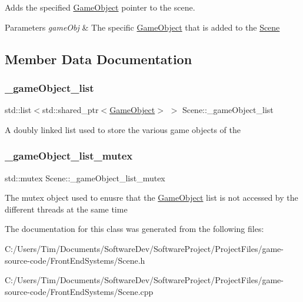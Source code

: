 Adds the specified \hyperlink{class_game_object}{Game\+Object} pointer to the scene. 


\begin{DoxyParams}{Parameters}
{\em game\+Obj} & The specific \hyperlink{class_game_object}{Game\+Object} that is added to the \hyperlink{class_scene}{Scene} \\
\hline
\end{DoxyParams}


\subsection{Member Data Documentation}
\mbox{\label{class_scene_a3ce74c2bdeb1bca46221645b309aa8cf}} 
\subsubsection{\texorpdfstring{\+\_\+game\+Object\+\_\+list}{\_gameObject\_list}}
{\footnotesize\ttfamily std\+::list$<$std\+::shared\+\_\+ptr$<$\hyperlink{class_game_object}{Game\+Object}$>$ $>$ Scene\+::\+\_\+game\+Object\+\_\+list\hspace{0.3cm}{\ttfamily [private]}}

A doubly linked list used to store the various game objects of the \mbox{\label{class_scene_a29183cf37f5227ea9a82d2a15c42336c}} 
\subsubsection{\texorpdfstring{\+\_\+game\+Object\+\_\+list\+\_\+mutex}{\_gameObject\_list\_mutex}}
{\footnotesize\ttfamily std\+::mutex Scene\+::\+\_\+game\+Object\+\_\+list\+\_\+mutex}

The mutex object used to enusre that the \hyperlink{class_game_object}{Game\+Object} list is not accessed by the different threads at the same time 

The documentation for this class was generated from the following files\+:\begin{DoxyCompactItemize}
\item 
C\+:/\+Users/\+Tim/\+Documents/\+Software\+Dev/\+Software\+Project/\+Project\+Files/game-\/source-\/code/\+Front\+End\+Systems/Scene.\+h\item 
C\+:/\+Users/\+Tim/\+Documents/\+Software\+Dev/\+Software\+Project/\+Project\+Files/game-\/source-\/code/\+Front\+End\+Systems/Scene.\+cpp\end{DoxyCompactItemize}
